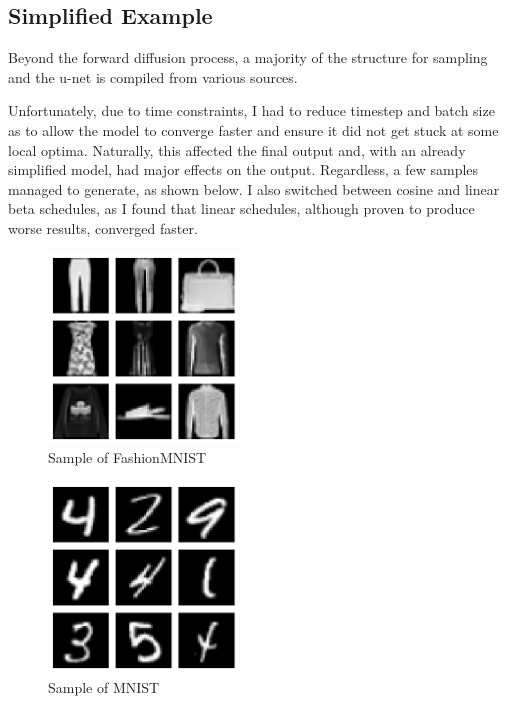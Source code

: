 \documentclass[conference]{IEEEtran}
\begin{document}
\subsection{Simplified Example}

Beyond the forward diffusion process, a majority of the structure for sampling
and the u-net is compiled from various sources.

Unfortunately, due to time constraints, I had to reduce timestep and batch size
as to allow the model to converge faster and ensure it did not get stuck at
some local optima. Naturally, this affected the final output and, with an
already simplified model, had major effects on the output. Regardless, a few
samples managed to generate, as shown below. I also switched between cosine and
linear beta schedules, as I found that linear schedules, although proven to
produce worse results, converged faster.

\begin{figure}[htbp]
    \centering
    \includegraphics[width=0.45\textwidth]{../images/datasam.png}
    \caption{Sample of FashionMNIST}
    \label{fig:FashionMNIST}
\end{figure}

\begin{figure}[htbp]
    \centering
    \includegraphics[width=0.45\textwidth]{../images/mnist.png}
    \caption{Sample of MNIST}
    \label{fig:MNIST}
\end{figure}
\end{document}
